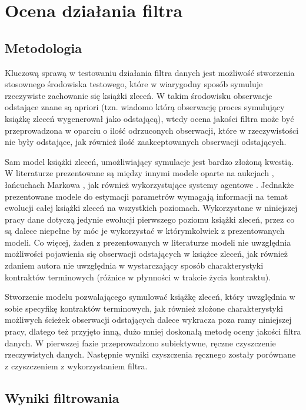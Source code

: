 \documentclass[a4paper,12pt,openany, DIV=calc, headsepline]{scrbook}
\begin{document}
\chapter{Ocena działania filtra}

\section{Metodologia}

Kluczową sprawą w testowaniu działania filtra danych jest możliwość stworzenia stosownego środowiska testowego, które w wiarygodny sposób symuluje rzeczywiste zachowanie się książki zleceń. W takim środowisku obserwacje odstające znane są apriori (tzn. wiadomo którą obserwację proces symulujący książkę zleceń wygenerował jako odstającą), wtedy ocena jakości filtra może być przeprowadzona w oparciu o ilość odrzuconych obserwacji, które w rzeczywistości nie były odstające, jak również ilość zaakceptowanych obserwacji odstających.

Sam model książki zleceń, umożliwiający symulacje jest bardzo złożoną kwestią. W literaturze prezentowane są między innymi modele oparte na aukcjach \citep{doubleAuction}, łańcuchach Markowa \citep{huang2015simulating}, jak również wykorzystujące systemy agentowe \citep{chiarella2009impact}. Jednakże prezentowane modele do estymacji parametrów wymagają informacji na temat ewolucji całej książki zleceń na wszystkich poziomach. Wykorzystane w niniejszej pracy dane dotyczą jedynie ewolucji pierwszego poziomu książki zleceń, przez co są dalece niepełne by móc je wykorzystać w którymkolwiek z prezentowanych modeli. Co więcej, żaden z prezentowanych w literaturze modeli nie uwzględnia możliwości pojawienia się obserwacji odstających w książce zleceń, jak również zdaniem autora nie uwzględnia w wystarczający sposób charakterystyki kontraktów terminowych (różnice w płynności w trakcie życia kontraktu). 

Stworzenie modelu pozwalającego symulować książkę zleceń, który uwzględnia w sobie specyfikę kontraktów terminowych, jak również złożone charakterystyki możliwych ścieżek obserwacji odstających dalece wykracza poza ramy niniejszej pracy, dlatego też przyjęto inną, dużo mniej doskonałą metodę oceny jakości filtra danych. W pierwszej fazie przeprowadzono subiektywne, ręczne czyszczenie rzeczywistych danych. Następnie wyniki czyszczenia ręcznego zostały porównane z czyszczeniem z wykorzystaniem filtra. 

\section{Wyniki filtrowania}
\end{document}
